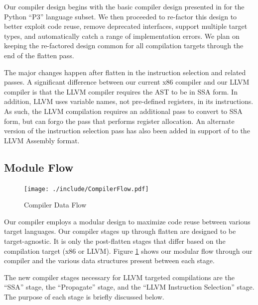 \documentclass[11pt,twocolumn]{article}
\begin{document}
Our compiler design begins with the basic compiler design presented in
\cite{siek-chang} for the Python ``P3'' language subset.  We then
proceeded to re-factor this design to better exploit code reuse,
remove deprecated interfaces, support multiple target types, and
automatically catch a range of implementation errors. We plan on
keeping the re-factored design common for all compilation targets
through the end of the flatten pass.

The major changes happen after flatten in the instruction selection
and related passes. A significant difference between our current x86
compiler and our LLVM compiler is that the LLVM compiler requires the
AST to be in SSA form. In addition, LLVM uses variable names, not
pre-defined registers, in its instructions. As such, the LLVM
compilation requires an additional pass to convert to SSA form, but
can forgo the pass that performs register allocation.  An alternate
version of the instruction selection pass has also been added in
support of to the LLVM Assembly format.

\subsection{Module Flow}
\label{sec:ModuleFlow}

\begin{figure}[htb]
   \centering
   \texttt{[image: ./include/CompilerFlow.pdf]}
   \caption{Compiler Data Flow}
   \label{fig:CompilerFlow}
\end{figure}

Our compiler employs a modular design to maximize code reuse between
various target languages.  Our compiler stages up through flatten are
designed to be target-agnostic. It is only the post-flatten stages
that differ based on the compilation target (x86 or LLVM). Figure
\ref{fig:CompilerFlow} shows our modular flow through our compiler and
the various data structures present between each stage.

The new compiler stages necessary for LLVM targeted compilations are
the ``SSA'' stage, the ``Propagate'' stage, and the ``LLVM Instruction
Selection'' stage. The purpose of each stage is briefly discussed
below.
\end{document}
